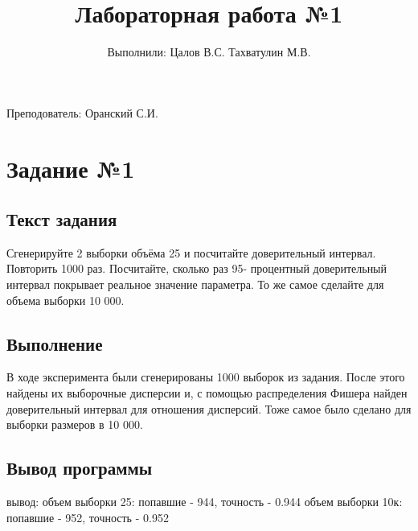 \documentclass{article}
\title{Лабораторная работа №1}
\author{Выполнили: Цалов В.С. Тахватулин М.В.}
\begin{document}
\maketitle
\begin{center}
      {\fontsize{14}{15}\selectfont
            Преподователь: Оранский С.И.
      }
\end{center}


\section{Задание №1}\label{sec:-no1}
\subsection{Текст задания}
Сгенерируйте 2 выборки объёма 25 и посчитайте доверительный интервал. Повторить 1000 раз. Посчитайте, сколько раз 95-
процентный доверительный интервал покрывает реальное значение параметра. То же самое
сделайте для объема выборки 10 000.

\subsection{Выполнение}
В ходе эксперимента были сгенерированы 1000 выборок из задания. 
После этого найдены их выборочные дисперсии и, с помощью распределения Фишера найден доверительный интервал для отношения дисперсий.
Тоже самое было сделано для выборки размеров в 10 000. 

\subsection{Вывод программы}
вывод:\newline
объем выборки 25:\newline
попавшие - 944, точность - 0.944\newline
объем выборки 10к:\newline
попавшие - 952, точность - 0.952
\end{document}
